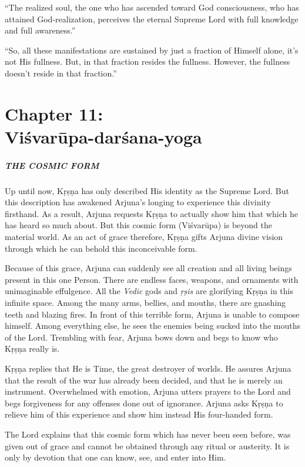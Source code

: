 \documentclass[12pt, twoside, openright]{memoir}
\begin{document}
\enquote{The realized soul, the one who has ascended toward God consciousness, who has attained God-realization, perceives the eternal Supreme Lord with full knowledge and full awareness.}

\enquote{So, all these manifestations are sustained by just a fraction of Himself alone, it’s not His fullness. But, in that fraction resides the fullness. However, the fullness doesn’t reside in that fraction.}
 \chapter{Chapter 11: \\Viśvarūpa-darśana-yoga}\label{chap-visvarupa-darsana-yoga}

\paragraph*{\MakeUppercase{The Cosmic Form}}


\noindent Up until now, Kṛṣṇa has only described His identity as the Supreme Lord. But this description has awakened Arjuna’s longing to experience this divinity firsthand. As a result, Arjuna requests Kṛṣṇa to actually show him that which he has heard so much about. But this cosmic form (Viśvarūpa) is beyond the material world. As an act of grace therefore, Kṛṣṇa gifts Arjuna divine vision through which he can behold this inconceivable form.

Because of this grace, Arjuna can suddenly see all creation and all living beings present in this one Person. There are endless faces, weapons, and ornaments with unimaginable effulgence. All the \textit{Vedic} gods and \textit{ṛṣis} are glorifying Kṛṣṇa in this infinite space. Among the many arms, bellies, and mouths, there are gnashing teeth and blazing fires. In front of this terrible form, Arjuna is unable to compose himself. Among everything else, he sees the enemies being sucked into the mouths of the Lord. Trembling with fear, Arjuna bows down and begs to know who Kṛṣṇa really is.

Kṛṣṇa replies that He is Time, the great destroyer of worlds. He assures Arjuna that the result of the war has already been decided, and that he is merely an instrument. Overwhelmed with emotion, Arjuna utters prayers to the Lord and begs forgiveness for any offenses done out of ignorance. Arjuna asks Kṛṣṇa to relieve him of this experience and show him instead His four-handed form.

The Lord explains that this cosmic form which has never been seen before, was given out of grace and cannot be obtained through any ritual or austerity. It is only by devotion that one can know, see, and enter into Him.
\end{document}
